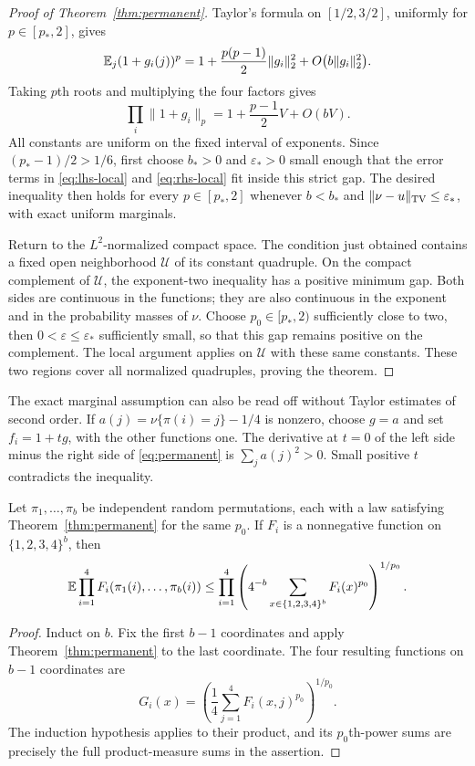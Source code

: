 \begin{proof}[Proof of Theorem~\ref{thm:permanent}]
Taylor's formula on $[1/2,3/2]$, uniformly for $p\in[p_*,2]$, gives
\[
 \mathbb E_j(1+g_i(j))^p
 =1+\frac{p(p-1)}2\|g_i\|_2^2
          +O\bigl(b\|g_i\|_2^2\bigr).
\]
Taking $p$th roots and multiplying the four factors gives
\begin{equation}\label{eq:rhs-local}
 \prod_i\|1+g_i\|_p
 =1+\frac{p-1}2 V+O(bV).
\end{equation}
All constants are uniform on the fixed interval of exponents. Since
$(p_*-1)/2>1/6$, first choose $b_*>0$ and $\varepsilon_*>0$ small enough that the error terms in \eqref{eq:lhs-local} and \eqref{eq:rhs-local} fit inside this strict gap. The desired inequality then holds for every $p\in[p_*,2]$ whenever $b<b_*$ and $\|\nu-u\|_{\operatorname{TV}}\le\varepsilon_*$, with exact uniform marginals.

Return to the $L^2$-normalized compact space. The condition just obtained contains a fixed open neighborhood $\mathcal U$ of its constant quadruple. On the compact complement of $\mathcal U$, the exponent-two inequality has a positive minimum gap. Both sides are continuous in the functions; they are also continuous in the exponent and in the probability masses of $\nu$. Choose $p_0\in[p_*,2)$ sufficiently close to two, then $0<\varepsilon\le\varepsilon_*$ sufficiently small, so that this gap remains positive on the complement. The local argument applies on $\mathcal U$ with these same constants. These two regions cover all normalized quadruples, proving the theorem.
\end{proof}

The exact marginal assumption can also be read off without Taylor estimates of second order. If $a(j)=\nu\{\pi(i)=j\}-1/4$ is nonzero, choose $g=a$ and set $f_i=1+t g$, with the other functions one. The derivative at $t=0$ of the left side minus the right side of \eqref{eq:permanent} is $\sum_j a(j)^2>0$. Small positive $t$ contradicts the inequality.

\begin{lemma}[Tensorization]\label{lem:tensorization}
Let $\pi_1,\ldots,\pi_b$ be independent random permutations, each with a law satisfying Theorem~\ref{thm:permanent} for the same $p_0$. If $F_i$ is a nonnegative function on $\{1,2,3,4\}^b$, then
\[
 \mathbb E\prod_{i=1}^4 F_i(\pi_1(i),\ldots,\pi_b(i))
 \le\prod_{i=1}^4
 \left(4^{-b}\sum_{x\in\{1,2,3,4\}^b}F_i(x)^{p_0}\right)^{1/p_0}.
\]
\end{lemma}
\begin{proof}
Induct on $b$. Fix the first $b-1$ coordinates and apply Theorem~\ref{thm:permanent} to the last coordinate. The four resulting functions on $b-1$ coordinates are
\[
 G_i(x)=\left(\frac14\sum_{j=1}^4 F_i(x,j)^{p_0}\right)^{1/p_0}.
\]
The induction hypothesis applies to their product, and its $p_0$th-power sums are precisely the full product-measure sums in the assertion.
\end{proof}

